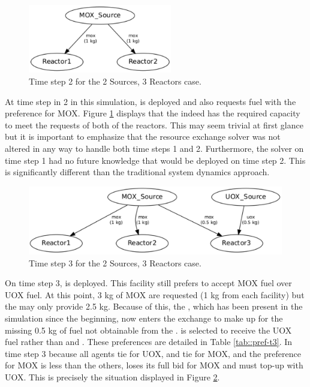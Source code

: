 \begin{figure}
  \begin{center}
    \includegraphics[height=3cm]{./figs/2_Sources_3_Reactors-t2.pdf}
    \caption[]{\label{fig::2srcs3rxts-t2}Time step 2 for the 2 Sources, 3 Reactors 
        case.}
  \end{center}
\end{figure}

At time step in 2 in this simulation,  is deployed and also requests 
fuel with the preference for MOX.  Figure \ref{fig::2srcs3rxts-t2} displays
that the \MOXSource{} indeed has the required capacity to meet the requests of 
both of the reactors.  This may seem trivial at first glance but it is important 
to emphasize that the resource exchange solver was not altered in any way to handle 
both time steps 1 and 2.  Furthermore, the solver on time step 1 had no future 
knowledge that  would be deployed on time step 2.  This is significantly 
different than the traditional system dynamics approach.

\begin{figure}
  \begin{center}
    \includegraphics[height=3cm]{./figs/2_Sources_3_Reactors-t3.pdf}
    \caption[]{\label{fig::2srcs3rxts-t3}Time step 3 for the 2 Sources, 3 Reactors 
        case.}
  \end{center}
\end{figure}

On time step 3,  is deployed.  This facility still prefers to accept 
MOX fuel over UOX fuel.  At this point, 3 kg of MOX are requested (1 kg from 
each facility) but the \MOXSource{} may only provide 2.5 kg.  Because of this, 
the \UOXSource{}, which has been present in the simulation since the beginning, 
now enters the exchange to make up for the missing 0.5 kg of fuel not obtainable 
from the \MOXSource{}.  is selected to receive the UOX fuel rather than 
 and .  These preferences are detailed in Table \ref{tab::pref-t3}.  In time step 3 because all agents tie for UOX, 
 and  tie for MOX, and the  preference for MOX is 
less than the others,  loses its full bid for MOX and must top-up with 
UOX.  This is precisely the situation displayed in Figure \ref{fig::2srcs3rxts-t3}.


